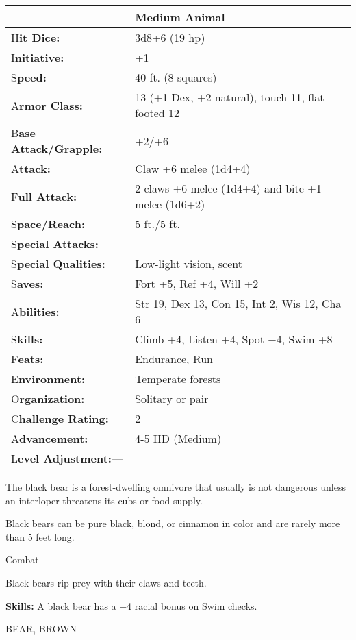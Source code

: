 \documentclass{article}
\begin{document}
\begin{tabular}{|>{\raggedright}p{91pt}|>{\raggedright}p{212pt}|}
\hline
  & Medium Animal\tabularnewline
\hline
H\textbf{it Dice:} & 3d8+6 (19 hp)\tabularnewline
\hline
I\textbf{nitiative:} & +1\tabularnewline
\hline
S\textbf{peed:} & 40 ft. (8 squares)\tabularnewline
\hline
A\textbf{rmor Class:} & 13 (+1 Dex, +2 natural), touch 11, flat-footed 12\tabularnewline
\hline
B\textbf{ase Attack/Grapple:} & +2/+6\tabularnewline
\hline
A\textbf{ttack:} & Claw +6 melee (1d4+4)\tabularnewline
\hline
F\textbf{ull Attack:} & 2 claws +6 melee (1d4+4) and bite +1 melee (1d6+2)\tabularnewline
\hline
S\textbf{pace/Reach:} & 5 ft./5 ft.\tabularnewline
\hline
S\textbf{pecial Attacks:}--- & \tabularnewline
\hline
S\textbf{pecial Qualities:} & Low-light vision, scent\tabularnewline
\hline
S\textbf{aves:} & Fort +5, Ref +4, Will +2\tabularnewline
\hline
A\textbf{bilities:} & Str 19, Dex 13, Con 15, Int 2, Wis 12, Cha 6\tabularnewline
\hline
S\textbf{kills:} & Climb +4, Listen +4, Spot +4, Swim +8\tabularnewline
\hline
F\textbf{eats:} & Endurance, Run\tabularnewline
\hline
E\textbf{nvironment:} & Temperate forests\tabularnewline
\hline
O\textbf{rganization:} & Solitary or pair\tabularnewline
\hline
C\textbf{hallenge Rating:} & 2\tabularnewline
\hline
A\textbf{dvancement:} & 4-5 HD (Medium)\tabularnewline
\hline
L\textbf{evel Adjustment:}--- & \tabularnewline
\hline
\end{tabular}

The black bear is a forest-dwelling omnivore that usually is not dangerous unless 
an interloper threatens its cubs or food supply.

Black bears can be pure black, blond, or cinnamon in color and are rarely more 
than 5 feet long.

Combat

Black bears rip prey with their claws and teeth.

\textbf{Skills:} A black bear has a +4 racial bonus on Swim checks.

\vspace{12pt}
BEAR, BROWN
\end{document}
